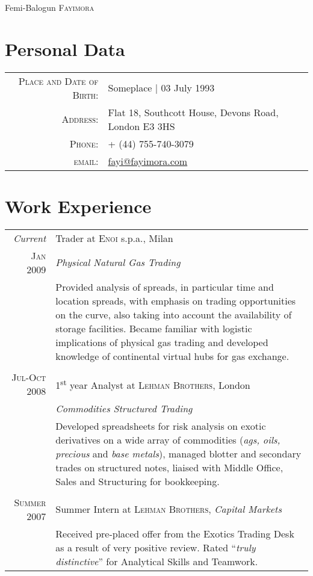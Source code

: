 \documentclass[a4paper,10pt]{article}
\begin{document}
\pagestyle{empty} %


\par{\centering
  {\Huge Femi-Balogun \textsc{Fayimora}
}\bigskip\par}

\section{Personal Data}

\begin{tabular}{rl}
  \textsc{Place and Date of Birth:} & Someplace  | 03 July 1993 \\
  \textsc{Address:}   & Flat 18, Southcott House, Devons Road, London E3 3HS \\
  \textsc{Phone:}     & + (44) 755-740-3079 \\
  \textsc{email:}     & \href{mailto:fayi@fayimora.com}{fayi@fayimora.com}
\end{tabular}

\section{Work Experience}
\begin{tabular}{r|p{11cm}}
  \emph{Current} & Trader at \textsc{Enoi} s.p.a., Milan \\\textsc{Jan 2009}&\emph{Physical Natural
  Gas Trading}\\&\footnotesize{Provided analysis of spreads, in particular time and location spreads,
  with emphasis on trading opportunities on the curve, also taking into account the availability of
  storage facilities. Became familiar with logistic implications of physical gas trading and
  developed knowledge of continental virtual hubs for gas exchange.}\\\multicolumn{2}{c}{} \\

  \textsc{Jul-Oct 2008} & 1\textsuperscript{st} year Analyst at \textsc{Lehman Brothers}, London
  \\&\emph{Commodities Structured Trading}\\&\footnotesize{Developed spreadsheets for risk analysis
  on exotic derivatives on a wide array of commodities (\textit{ags, oils, precious} and
  \textit{base metals}), managed blotter and secondary trades on structured notes, liaised with
  Middle Office, Sales and Structuring for bookkeeping.}\\\multicolumn{2}{c}{} \\

  \textsc{Summer 2007} & Summer Intern at \textsc{Lehman Brothers}, \emph{Capital
  Markets}\\&\footnotesize{Received pre-placed offer from the Exotics Trading Desk as a result of
  very positive review. Rated ``\emph{truly distinctive}'' for Analytical Skills and Teamwork.}
\end{tabular}
\end{document}
